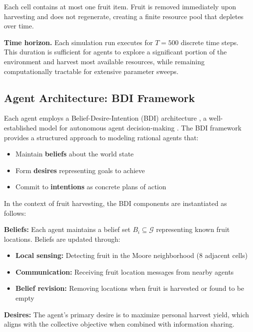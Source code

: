Each cell contains at most one fruit item. Fruit is removed immediately upon harvesting and does not regenerate, creating a finite resource pool that depletes over time.

\textbf{Time horizon.} Each simulation run executes for $T = 500$ discrete time steps. This duration is sufficient for agents to explore a significant portion of the environment and harvest most available resources, while remaining computationally tractable for extensive parameter sweeps.

\subsection{Agent Architecture: BDI Framework}

Each agent employs a Belief-Desire-Intention (BDI) architecture \citep{bratman1987intention, rao1995bdi}, a well-established model for autonomous agent decision-making \citep{georgeff1999belief, wooldridge2009introduction}. The BDI framework provides a structured approach to modeling rational agents that:

\begin{itemize}
    \item Maintain \textbf{beliefs} about the world state
    \item Form \textbf{desires} representing goals to achieve
    \item Commit to \textbf{intentions} as concrete plans of action
\end{itemize}

In the context of fruit harvesting, the BDI components are instantiated as follows:

\textbf{Beliefs:} Each agent maintains a belief set $B_i \subseteq \mathcal{G}$ representing known fruit locations. Beliefs are updated through:
\begin{itemize}
    \item \textbf{Local sensing:} Detecting fruit in the Moore neighborhood (8 adjacent cells)
    \item \textbf{Communication:} Receiving fruit location messages from nearby agents
    \item \textbf{Belief revision:} Removing locations when fruit is harvested or found to be empty
\end{itemize}

\textbf{Desires:} The agent's primary desire is to maximize personal harvest yield, which aligns with the collective objective when combined with information sharing.

